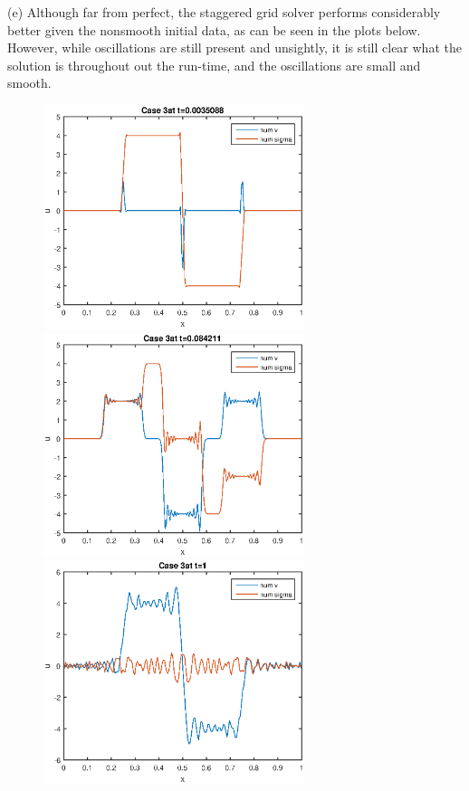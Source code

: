 (e) Although far from perfect, the staggered grid solver performs considerably better given the nonsmooth initial data, as can be seen in the plots below. However, while oscillations are still present and unsightly, it is still clear what the solution is throughout out the run-time, and the oscillations are small and smooth.
\pagebreak
\begin{figure}[ht]
\centering
\includegraphics[width=3in]{initStag3}
\includegraphics[width=3in]{midStag3}\\
\includegraphics[width=3in]{endStag3}
\end{figure}


